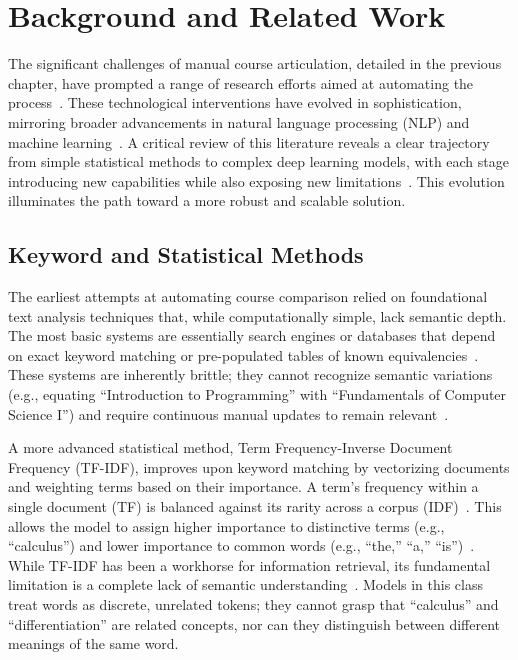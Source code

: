 \chapter{Background and Related Work}\label{ch:2}

The significant challenges of manual course articulation, detailed in the previous chapter, have prompted a range of research efforts aimed at automating the process~\cite{ma_course_recommendation_2017, PardosCourse2Vec2019, pardos-articulation-2019, JiangPardosMulti2VecEDM2020,XuPardosSubwordEmbeddings2024}. These technological interventions have evolved in sophistication, mirroring broader advancements in natural language processing (NLP) and machine learning~\cite{shiferaw2024}. A critical review of this literature reveals a clear trajectory from simple statistical methods to complex deep learning models, with each stage introducing new capabilities while also exposing new limitations~\cite{pardos-articulation-2019}. This evolution illuminates the path toward a more robust and scalable solution.

\section{Keyword and Statistical Methods}\label{ch:2.1}
The earliest attempts at automating course comparison relied on foundational text analysis techniques that, while computationally simple, lack semantic depth. The most basic systems are essentially search engines or databases that depend on exact keyword matching or pre-populated tables of known equivalencies~\cite{shamrock}. These systems are inherently brittle; they cannot recognize semantic variations (e.g., equating ``Introduction to Programming'' with ``Fundamentals of Computer Science I'') and require continuous manual updates to remain relevant~\cite{shiferaw2024}.

A more advanced statistical method, Term Frequency-Inverse Document Frequency (TF-IDF), improves upon keyword matching by vectorizing documents and weighting terms based on their importance. A term's frequency within a single document (TF) is balanced against its rarity across a corpus (IDF)~\cite{AIZAWA200345}. This allows the model to assign higher importance to distinctive terms (e.g., ``calculus'') and lower importance to common words (e.g., ``the,'' ``a,'' ``is'')~\cite{AIZAWA200345}. While TF-IDF has been a workhorse for information retrieval, its fundamental limitation is a complete lack of semantic understanding~\cite{AIZAWA200345}. Models in this class treat words as discrete, unrelated tokens; they cannot grasp that ``calculus'' and ``differentiation'' are related concepts, nor can they distinguish between different meanings of the same word.

